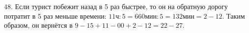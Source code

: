 48. Если турист побежит назад в 5 раз быстрее, то он на обратную дорогу потратит в 5 раз меньше времени: $11\text{ч}:5=660\text{мин}:5=132\text{мин}=2-12.$ Таким образом, он вернётся в $9-15+11-00+2-12=22-27.$\\

